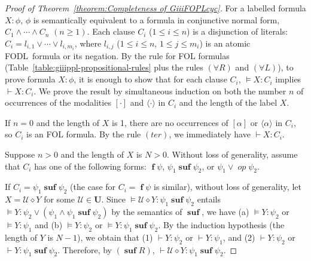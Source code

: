 \documentclass[manuscript,screen]{acmart}
\newcommand{\mcl}[1]{\mathcal{#1}}
\newcommand{\la}[0]{\langle}
\newcommand{\ra}[0]{\rangle}
\newcommand{\cat}[0]{\diamond}
\DeclareMathOperator{\ofst}{\mathbf{f}}
\DeclareMathOperator{\osuf}{\mathbf{suf}}
\DeclareMathOperator{\op}{\mathit{op}}
\newcommand{\Upd}[0]{\textbf{U}}
\newcommand{\upd}[0]{\mcl{U}}
\newcommand{\FODL}[0]{\mbox{FODL}}
\begin{document}
\begin{proof}[Proof of Theorem~\ref{theorem:Completeness of GiiiFOPLcyc}]
    For a labelled formula $X : \phi$, 
$\phi$ is semantically equivalent to a formula in conjunctive normal form, $C_1\wedge \cdots\wedge C_n$ $(n\ge 1)$. 
    Each clause $C_i$ ($1\le i\le n$) is a disjunction of literals: 
$C_i = l_{i,1}\vee \cdots\vee l_{i,m_i}$, where $l_{i,j}$ ($1\le i\le n$, $1\le j\le m_i$) is an atomic \FODL\ formula or its negation. 
    By the rule for FOL formulas (Table~\ref{table:giiippl-propositional-rules} plus the rules $(\forall R)$ and $(\forall L)$), 
    to prove formula $X : \phi$, 
    it is enough to show that for each clause $C_i$, $\models X : C_i$ implies $\vdash X : C_i$.  
We prove the result by simultaneous induction on both the number $n$ of occurrences of the modalities $[\cdot]$ and $\la\cdot\ra$ in $C_i$ and the length of the label $X$. 

If $n=0$ and the length of $X$ is 1, there are no occurrences of $[\alpha]$ or $\la\alpha\ra$ in $C_i$, so $C_i$ is an FOL formula. By the rule $(\textit{ter})$, we immediately have $\vdash X : C_i$. 

Suppose $n>0$ and the length of $X$ is $N>0$. Without loss of generality, assume that $C_i$ has one of the following forms: $\ofst \psi$, $\psi_1\osuf \psi_2$, or $\psi_1\vee \op \psi_2$. 

    If $C_i = \psi_1\osuf \psi_2$ (the case for $C_i = \ofst \psi$ is similar), without loss of generality, let $X = \upd\cat Y$ for some $\upd\in \Upd$. 
Since $\models \upd\cat Y : \psi_1\osuf \psi_2$ entails $\models Y : \psi_2\vee (\psi_1\wedge \psi_1\osuf \psi_2)$ by the semantics of $\osuf$, we have (a) $\models Y : \psi_2$ or $\models Y : \psi_1$ and (b) $\models Y : \psi_2$ or $\models Y : \psi_1\osuf\psi_2$. 
By the induction hypothesis (the length of $Y$ is $N-1$), 
    we obtain that (1) $\vdash Y : \psi_2$ or $\vdash Y : \psi_1$, and (2) $\vdash Y : \psi_2$ or $\vdash Y : \psi_1\osuf\psi_2$. 
    Therefore, by $(\osuf R)$, $\vdash \upd\cat Y : \psi_1\osuf \psi_2$. 


\end{proof}
\end{document}
